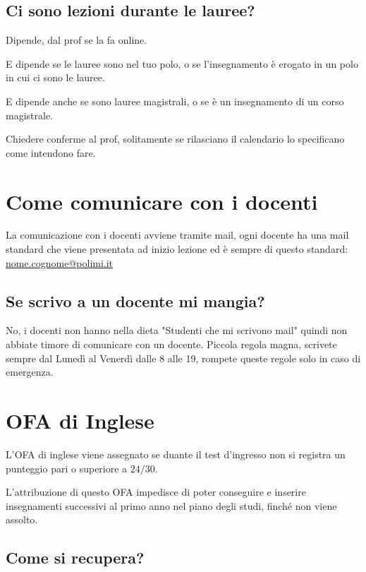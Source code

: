 \documentclass[legal]{polinetwork}
\begin{document}
\subsection{Ci sono lezioni durante le lauree?}


Dipende, dal prof se la fa online.

E dipende se le lauree sono nel tuo polo, o se l'insegnamento è erogato in un polo in cui ci sono le lauree.

E dipende anche se sono lauree magistrali, o se è un insegnamento di un corso magistrale.

Chiedere conferme al prof, solitamente se rilasciano il calendario lo specificano come intendono fare.

\section{Come comunicare con i docenti}


La comunicazione con i docenti avviene tramite mail, ogni docente ha una mail standard che viene presentata ad inizio lezione ed è sempre di questo standard: \href{mailto:nome.cognome@polimi.it}{nome.cognome@polimi.it}

\subsection{Se scrivo a un docente mi mangia?}


No, i docenti non hanno nella dieta "Studenti che mi scrivono mail" quindi non abbiate timore di comunicare con un docente. Piccola regola magna, scrivete sempre dal Lunedì al Venerdì dalle 8 alle 19, rompete queste regole solo in caso di emergenza.

\section{OFA di Inglese}


L'OFA di inglese viene assegnato se duante il test d'ingresso non si registra un punteggio pari o superiore a $24/30$.

L'attribuzione di questo OFA impedisce di poter conseguire e inserire insegnamenti successivi al primo anno nel piano degli studi, finché non viene assolto.

\subsection{Come si recupera?}
\end{document}
